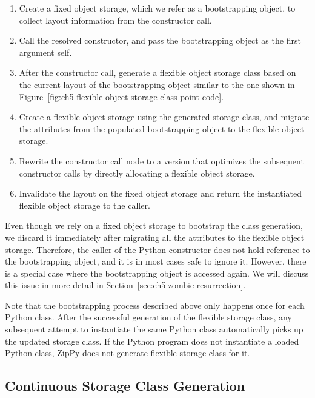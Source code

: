 \begin{enumerate}

\item Create a fixed object storage, which we refer as a bootstrapping object, to collect layout information from the constructor call.

\item Call the resolved constructor, and pass the bootstrapping object as the first argument \textsf{self}.

\item After the constructor call, generate a flexible object storage class based on the current layout of the bootstrapping object similar to the one shown in Figure~\ref{fig:ch5-flexible-object-storage-class-point-code}.

\item Create a flexible object storage using the generated storage class, and migrate the attributes from the populated bootstrapping object to the flexible object storage.

\item Rewrite the constructor call node to a version that optimizes the subsequent constructor calls by directly allocating a flexible object storage.

\item Invalidate the layout on the fixed object storage and return the instantiated flexible object storage to the caller.

\end{enumerate}

Even though we rely on a fixed object storage to bootstrap the class generation, we discard it immediately after migrating all the attributes to the flexible object storage.
Therefore, the caller of the Python constructor does not hold reference to the bootstrapping object, and it is in most cases safe to ignore it.
However, there is a special case where the bootstrapping object is accessed again.
We will discuss this issue in more detail in Section~\ref{sec:ch5-zombie-resurrection}.

Note that the bootstrapping process described above only happens once for each Python class.
After the successful generation of the flexible storage class, any subsequent attempt to instantiate the same Python class automatically picks up the updated storage class.
If the Python program does not instantiate a loaded Python class, ZipPy does not generate flexible storage class for it.

\subsection{Continuous Storage Class Generation}
\label{sec:ch5-flexible-storage-layout-evolution}

